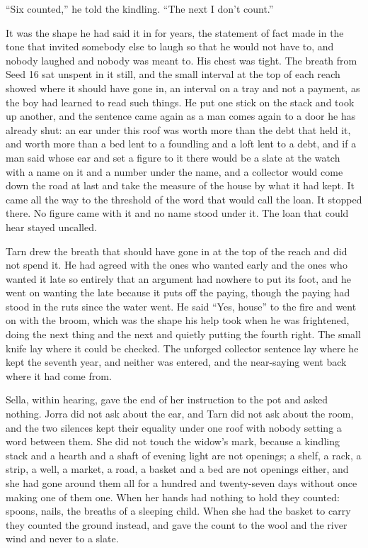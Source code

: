 “Six counted,” he told the kindling. “The next I don't count.”

It was the shape he had said it in for years, the statement of fact made in the tone that invited somebody else to laugh so that he would not have to, and nobody laughed and nobody was meant to. His chest was tight. The breath from Seed 16 sat unspent in it still, and the small interval at the top of each reach showed where it should have gone in, an interval on a tray and not a payment, as the boy had learned to read such things. He put one stick on the stack and took up another, and the sentence came again as a man comes again to a door he has already shut: an ear under this roof was worth more than the debt that held it, and worth more than a bed lent to a foundling and a loft lent to a debt, and if a man said whose ear and set a figure to it there would be a slate at the watch with a name on it and a number under the name, and a collector would come down the road at last and take the measure of the house by what it had kept. It came all the way to the threshold of the word that would call the loan. It stopped there. No figure came with it and no name stood under it. The loan that could hear stayed uncalled.

Tarn drew the breath that should have gone in at the top of the reach and did not spend it. He had agreed with the ones who wanted  early and the ones who wanted it late so entirely that an argument had nowhere to put its foot, and he went on wanting the late because it puts off the paying, though the paying had stood in the ruts since the water went. He said “Yes, house” to the fire and went on with the broom, which was the shape his help took when he was frightened, doing the next thing and the next and quietly putting the fourth right. The small knife lay where it could be checked. The unforged collector sentence lay where he kept the seventh year, and neither was entered, and the near-saying went back where it had come from.

Sella, within hearing, gave the end of her instruction to the pot and asked nothing. Jorra did not ask about the ear, and Tarn did not ask about the room, and the two silences kept their equality under one roof with nobody setting a word between them. She did not touch the widow's mark, because a kindling stack and a hearth and a shaft of evening light are not openings; a shelf, a rack, a strip, a well, a market, a road, a basket and a bed are not openings either, and she had gone around them all for a hundred and twenty-seven days without once making one of them one. When her hands had nothing to hold they counted: spoons, nails, the breaths of a sleeping child. When she had the basket to carry they counted the ground instead, and gave the count to the wool and the river wind and never to a slate.


